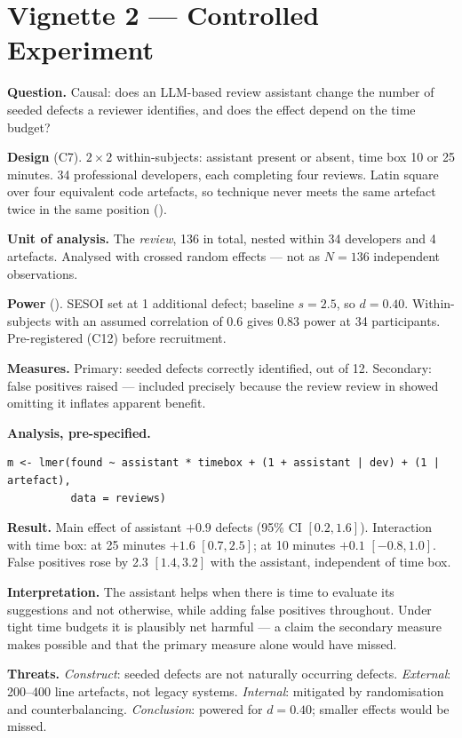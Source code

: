 \section{Vignette 2 --- Controlled Experiment}

\begin{vignette}
\textbf{Question.} Causal: does an LLM-based review assistant change the number
of seeded defects a reviewer identifies, and does the effect depend on the time
budget?

\medskip
\textbf{Design} (C7). $2\times2$ within-subjects: assistant present or absent,
time box 10 or 25 minutes. 34 professional developers, each completing four
reviews. Latin square over four equivalent code artefacts, so technique never
meets the same artefact twice in the same position ().

\medskip
\textbf{Unit of analysis.} The \emph{review}, 136 in total, nested within 34
developers and 4 artefacts. Analysed with crossed random effects --- not as
$N=136$ independent observations.

\medskip
\textbf{Power} (). SESOI set at 1 additional defect; baseline
$s = 2.5$, so $d = 0.40$. Within-subjects with an assumed correlation of 0.6
gives 0.83 power at 34 participants. Pre-registered (C12) before recruitment.

\medskip
\textbf{Measures.} Primary: seeded defects correctly identified, out of 12.
Secondary: false positives raised --- included precisely because the review
review in  showed omitting it inflates apparent benefit.

\medskip
\textbf{Analysis, pre-specified.}
\begin{lstlisting}[language=Rlang]
m <- lmer(found ~ assistant * timebox + (1 + assistant | dev) + (1 | artefact),
          data = reviews)
\end{lstlisting}

\medskip
\textbf{Result.} Main effect of assistant $+0.9$ defects (95\% CI $[0.2,
1.6]$). Interaction with time box: at 25 minutes $+1.6$ $[0.7, 2.5]$; at 10
minutes $+0.1$ $[-0.8, 1.0]$. False positives rose by 2.3 $[1.4, 3.2]$ with the
assistant, independent of time box.

\medskip
\textbf{Interpretation.} The assistant helps when there is time to evaluate its
suggestions and not otherwise, while adding false positives throughout. Under
tight time budgets it is plausibly net harmful --- a claim the secondary
measure makes possible and that the primary measure alone would have missed.

\medskip
\textbf{Threats.} \emph{Construct}: seeded defects are not naturally occurring
defects. \emph{External}: 200--400 line artefacts, not legacy systems.
\emph{Internal}: mitigated by randomisation and counterbalancing. \emph{Conclusion}:
powered for $d = 0.40$; smaller effects would be missed.
\end{vignette}


